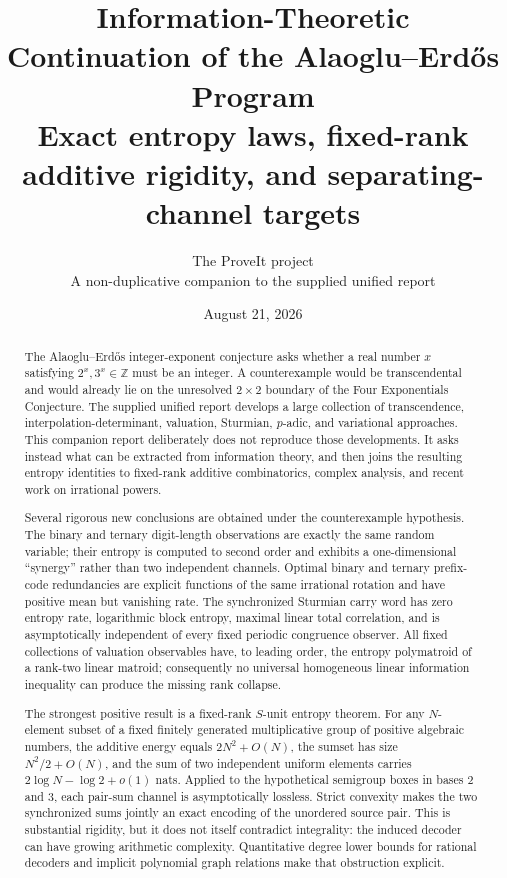 \documentclass[11pt,oneside]{article}
\title{\textbf{Information-Theoretic Continuation of the Alaoglu--Erd\H{o}s Program}\\[0.35em]
\large Exact entropy laws, fixed-rank additive rigidity, and separating-channel targets}
\author{The ProveIt project\\
\small A non-duplicative companion to the supplied unified report}
\date{August 21, 2026}
\theoremstyle{definition}
\theoremstyle{remark}
\newcommand{\Z}{\mathbb{Z}}
\begin{document}
\maketitle

\begin{abstract}
The Alaoglu--Erd\H{o}s integer-exponent conjecture asks whether a real number $x$ satisfying $2^x,3^x\in\Z$ must be an integer.  A counterexample would be transcendental and would already lie on the unresolved $2\times2$ boundary of the Four Exponentials Conjecture.  The supplied unified report develops a large collection of transcendence, interpolation-determinant, valuation, Sturmian, $p$-adic, and variational approaches.  This companion report deliberately does not reproduce those developments.  It asks instead what can be extracted from information theory, and then joins the resulting entropy identities to fixed-rank additive combinatorics, complex analysis, and recent work on irrational powers.

Several rigorous new conclusions are obtained under the counterexample hypothesis.  The binary and ternary digit-length observations are exactly the same random variable; their entropy is computed to second order and exhibits a one-dimensional ``synergy'' rather than two independent channels.  Optimal binary and ternary prefix-code redundancies are explicit functions of the same irrational rotation and have positive mean but vanishing rate.  The synchronized Sturmian carry word has zero entropy rate, logarithmic block entropy, maximal linear total correlation, and is asymptotically independent of every fixed periodic congruence observer.  All fixed collections of valuation observables have, to leading order, the entropy polymatroid of a rank-two linear matroid; consequently no universal homogeneous linear information inequality can produce the missing rank collapse.

The strongest positive result is a fixed-rank $S$-unit entropy theorem.  For any $N$-element subset of a fixed finitely generated multiplicative group of positive algebraic numbers, the additive energy equals $2N^2+O(N)$, the sumset has size $N^2/2+O(N)$, and the sum of two independent uniform elements carries $2\log N-\log2+o(1)$ nats.  Applied to the hypothetical semigroup boxes in bases $2$ and $3$, each pair-sum channel is asymptotically lossless.  Strict convexity makes the two synchronized sums jointly an exact encoding of the unordered source pair.  This is substantial rigidity, but it does not itself contradict integrality: the induced decoder can have growing arithmetic complexity.  Quantitative degree lower bounds for rational decoders and implicit polynomial graph relations make that obstruction explicit.


\end{abstract}
\end{document}

